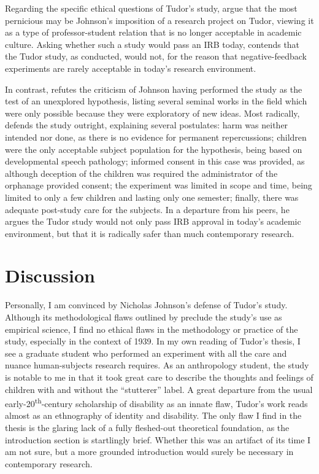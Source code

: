 \documentclass{../../../coursework}
\begin{document}
Regarding the specific ethical questions of Tudor's study,
\textcite{GoldfarbEthics05} argue that the most pernicious may be
Johnson's imposition of a research project on Tudor, viewing it as a
type of professor-student relation that is no longer acceptable in
academic culture. Asking whether such a study would pass an IRB today,
\textcite{GoldfarbEthics06} contends that the Tudor study, as conducted, would not,
for the reason that negative-feedback experiments are rarely acceptable
in today's research environment.

In contrast, \textcite{GoldfarbEthics07} refutes the criticism of Johnson having
performed the study as the test of an unexplored hypothesis, listing
several seminal works in the field which were only possible because they
were exploratory of new ideas. Most radically, \textcite{GoldfarbEthics09}
defends the study outright, explaining several postulates: harm was
neither intended nor done, as there is no evidence for permanent
repercussions; children were the only acceptable subject population for
the hypothesis, being based on developmental speech pathology; informed
consent in this case was provided, as although deception of the children
was required the administrator of the orphanage provided consent; the
experiment was limited in scope and time, being limited to only a few
children and lasting only one semester; finally, there was adequate
post-study care for the subjects. In a departure from his peers, he
argues the Tudor study would not only pass IRB approval in today's
academic environment, but that it is radically safer than much
contemporary research.

\section{Discussion}

Personally, I am convinced by Nicholas Johnson's defense of Tudor's
study. Although its methodological flaws outlined by \textcite{Amb02}
preclude the study's use as empirical science, I find no ethical
flaws in the methodology or practice of the study, especially in the
context of 1939. In my own reading of Tudor's thesis, I see a graduate
student who performed an experiment with all the care and nuance
human-subjects research requires. As an anthropology student, the study
is notable to me in that it took great care to describe the thoughts and
feelings of children with and without the ``stutterer'' label. A great
departure from the usual early-20\textsuperscript{th}-century
scholarship of disability as an innate flaw, Tudor's work reads almost
as an ethnography of identity and disability. The only flaw I find in
the thesis is the glaring lack of a fully fleshed-out theoretical
foundation, as the introduction section is startlingly brief. Whether
this was an artifact of its time I am not sure, but a more grounded
introduction would surely be necessary in contemporary research.
\end{document}
